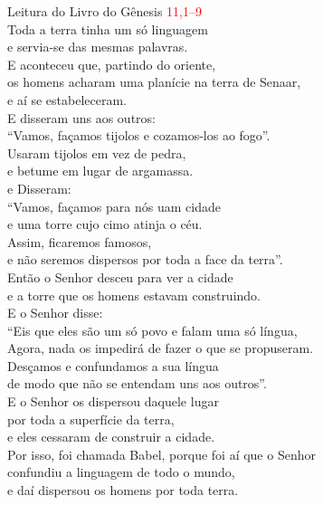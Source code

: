 \documentclass{book}
\begin{document}
\begin{flushleft}

    \vspace{.2cm}
    Leitura do Livro do Gênesis
    \hspace{\fill}
    \textcolor{red}{11,1--9}
    \vspace{.2cm} \\
    Toda a terra tinha um só linguagem \\
    e servia-se das mesmas palavras. \\
    E aconteceu que, partindo do oriente, \\
    os homens acharam uma planície na terra de Senaar, \\
    e aí se estabeleceram. \\
    E disseram uns aos outros: \\
    ``Vamos, façamos tijolos e cozamos-los ao fogo''. \\
    Usaram tijolos em vez de pedra, \\
    e betume em lugar de argamassa. \\
    e Disseram: \\
    ``Vamos, façamos para nós uam cidade \\
    e uma torre cujo cimo atinja o céu. \\
    Assim, ficaremos famosos, \\
    e não seremos dispersos por toda a face da terra''. \\
    Então o Senhor desceu para ver a cidade \\
    e a torre que os homens estavam construindo. \\
    E o Senhor disse: \\
    ``Eis que eles são um só povo e falam uma só língua, \\
    Agora, nada os impedirá de fazer o que se propuseram. \\
    Desçamos e confundamos a sua língua \\
    de modo que não se entendam uns aos outros''. \\
    E o Senhor os dispersou daquele lugar \\
    por toda a superfície da terra, \\
    e eles cessaram de construir a cidade. \\
    Por isso, foi chamada Babel, porque foi aí que o Senhor \\
    confundiu a linguagem de todo o mundo, \\
    e daí dispersou os homens por toda terra.

\end{flushleft}
\end{document}
